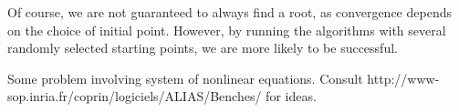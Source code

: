 Of course, we are not guaranteed to always find a root, as convergence depends on the choice of initial point.
However, by running the algorithms with several randomly selected starting points, we are more likely to 
be successful.

\begin{problem}
Some problem involving system of nonlinear equations. Consult http://www-sop.inria.fr/coprin/logiciels/ALIAS/Benches/ 
for ideas.
\end{problem}
